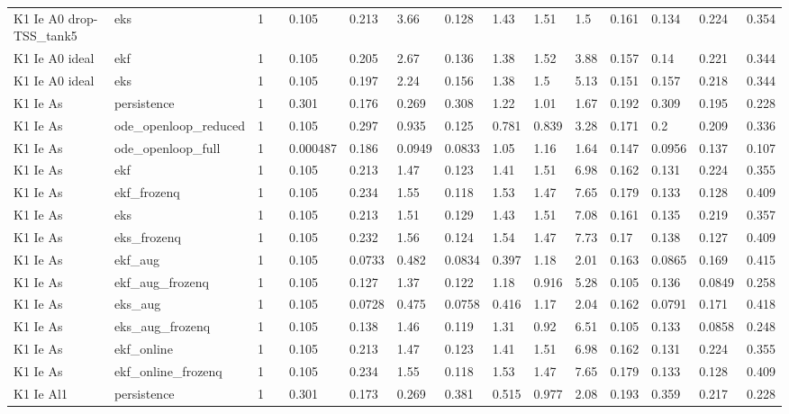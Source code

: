 \begin{table}[t]
\begin{tabular}{lllllllllllllll}
K1 Ie A0 drop-TSS\_tank5 & eks & 1 &  & 0.105 & 0.213 & 3.66 & 0.128 & 1.43 & 1.51 & 1.5 & 0.161 & 0.134 & 0.224 & 0.354 \\
K1 Ie A0 ideal & ekf & 1 &  & 0.105 & 0.205 & 2.67 & 0.136 & 1.38 & 1.52 & 3.88 & 0.157 & 0.14 & 0.221 & 0.344 \\
K1 Ie A0 ideal & eks & 1 &  & 0.105 & 0.197 & 2.24 & 0.156 & 1.38 & 1.5 & 5.13 & 0.151 & 0.157 & 0.218 & 0.344 \\
K1 Ie As & persistence & 1 &  & 0.301 & 0.176 & 0.269 & 0.308 & 1.22 & 1.01 & 1.67 & 0.192 & 0.309 & 0.195 & 0.228 \\
K1 Ie As & ode\_openloop\_reduced & 1 &  & 0.105 & 0.297 & 0.935 & 0.125 & 0.781 & 0.839 & 3.28 & 0.171 & 0.2 & 0.209 & 0.336 \\
K1 Ie As & ode\_openloop\_full & 1 &  & 0.000487 & 0.186 & 0.0949 & 0.0833 & 1.05 & 1.16 & 1.64 & 0.147 & 0.0956 & 0.137 & 0.107 \\
K1 Ie As & ekf & 1 &  & 0.105 & 0.213 & 1.47 & 0.123 & 1.41 & 1.51 & 6.98 & 0.162 & 0.131 & 0.224 & 0.355 \\
K1 Ie As & ekf\_frozenq & 1 &  & 0.105 & 0.234 & 1.55 & 0.118 & 1.53 & 1.47 & 7.65 & 0.179 & 0.133 & 0.128 & 0.409 \\
K1 Ie As & eks & 1 &  & 0.105 & 0.213 & 1.51 & 0.129 & 1.43 & 1.51 & 7.08 & 0.161 & 0.135 & 0.219 & 0.357 \\
K1 Ie As & eks\_frozenq & 1 &  & 0.105 & 0.232 & 1.56 & 0.124 & 1.54 & 1.47 & 7.73 & 0.17 & 0.138 & 0.127 & 0.409 \\
K1 Ie As & ekf\_aug & 1 &  & 0.105 & 0.0733 & 0.482 & 0.0834 & 0.397 & 1.18 & 2.01 & 0.163 & 0.0865 & 0.169 & 0.415 \\
K1 Ie As & ekf\_aug\_frozenq & 1 &  & 0.105 & 0.127 & 1.37 & 0.122 & 1.18 & 0.916 & 5.28 & 0.105 & 0.136 & 0.0849 & 0.258 \\
K1 Ie As & eks\_aug & 1 &  & 0.105 & 0.0728 & 0.475 & 0.0758 & 0.416 & 1.17 & 2.04 & 0.162 & 0.0791 & 0.171 & 0.418 \\
K1 Ie As & eks\_aug\_frozenq & 1 &  & 0.105 & 0.138 & 1.46 & 0.119 & 1.31 & 0.92 & 6.51 & 0.105 & 0.133 & 0.0858 & 0.248 \\
K1 Ie As & ekf\_online & 1 &  & 0.105 & 0.213 & 1.47 & 0.123 & 1.41 & 1.51 & 6.98 & 0.162 & 0.131 & 0.224 & 0.355 \\
K1 Ie As & ekf\_online\_frozenq & 1 &  & 0.105 & 0.234 & 1.55 & 0.118 & 1.53 & 1.47 & 7.65 & 0.179 & 0.133 & 0.128 & 0.409 \\
K1 Ie Al1 & persistence & 1 &  & 0.301 & 0.173 & 0.269 & 0.381 & 0.515 & 0.977 & 2.08 & 0.193 & 0.359 & 0.217 & 0.228 \\

\end{tabular}
\end{table}
